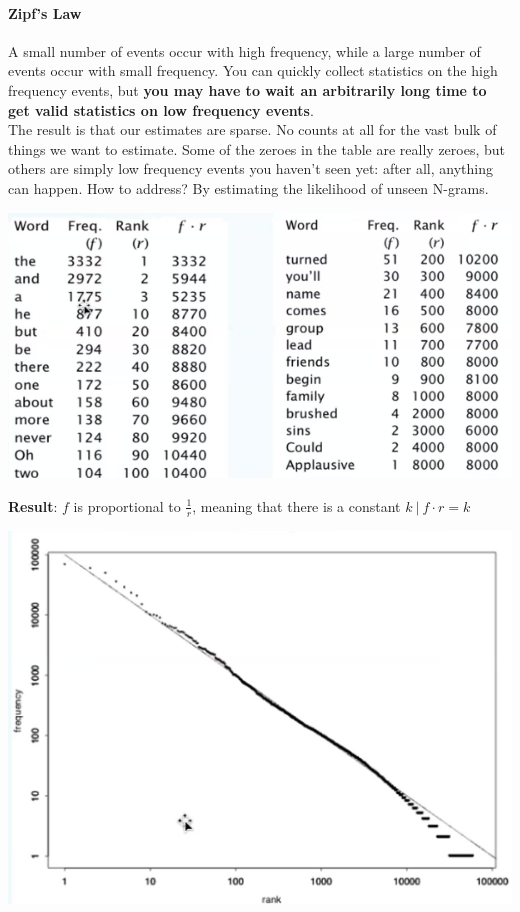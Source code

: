 \documentclass[10pt]{report}
\begin{document}
\paragraph{Zipf's Law} A small number of events occur with high frequency, while a large number of events occur with small frequency. You can quickly collect statistics on the high frequency events, but \textbf{you may have to wait an arbitrarily long time to get valid statistics on low frequency events}.\\
The result is that our estimates are sparse. No counts at all for the vast bulk of things we want to estimate. Some of the zeroes in the table are really zeroes, but others are simply low frequency events you haven't seen yet: after all, anything can happen. How to address? By estimating the likelihood of unseen N-grams.
\begin{center}
	\includegraphics[scale=0.70]{1.png}
\end{center}
\textbf{Result}: $f$ is proportional to $\frac{1}{r}$, meaning that there is a constant $k\:|\:f\cdot r = k$
\begin{center}
	\includegraphics[scale=0.70]{2.png}
\end{center}
\end{document}
